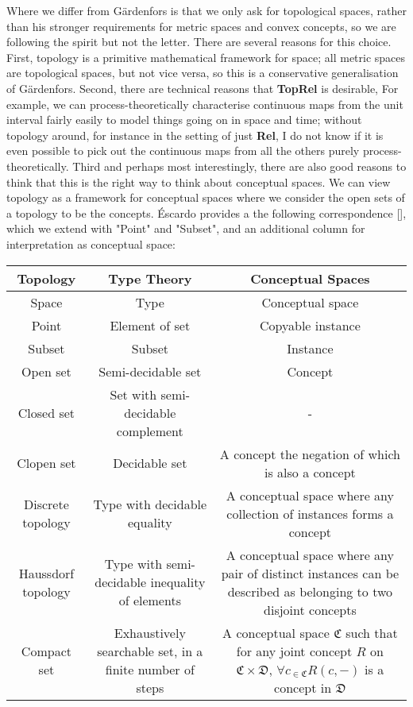 \begin{fullwidth}
Where we differ from G\"{a}rdenfors is that we only ask for topological spaces, rather than his stronger requirements for metric spaces and convex concepts, so we are following the spirit but not the letter. There are several reasons for this choice. First, topology is a primitive mathematical framework for space; all metric spaces are topological spaces, but not vice versa, so this is a conservative generalisation of G\"{a}rdenfors. Second, there are technical reasons that \textbf{TopRel} is desirable, For example, we can process-theoretically characterise continuous maps from the unit interval fairly easily to model things going on in space and time; without topology around, for instance in the setting of just \textbf{Rel}, I do not know if it is even possible to pick out the continuous maps from all the others purely process-theoretically. Third and perhaps most interestingly, there are also good reasons to think that this is the right way to think about conceptual spaces. We can view topology as a framework for conceptual spaces where we consider the open sets of a topology to be the concepts. \'{E}scardo provides a the following correspondence [], which we extend with "Point" and "Subset", and an additional column for interpretation as conceptual space:

\begin{table}[h]
\begin{tabular}{|c|c|c|}
\hline
\textbf{Topology} & \textbf{Type Theory} & \textbf{Conceptual Spaces}  \\ \hline
Space & Type & Conceptual space \\  \hline
Point & Element of set & Copyable instance \\  \hline
Subset & Subset & Instance \\  \hline
Open set & Semi-decidable set & Concept \\ \hline
Closed set & Set with semi-decidable complement & - \\ \hline
Clopen set & Decidable set & A concept the negation of which is also a concept \\ \hline
Discrete topology & Type with decidable equality & A conceptual space where any collection of instances forms a concept \\ \hline
Haussdorf topology & Type with semi-decidable inequality of elements & A conceptual space where any pair of distinct instances can be described as belonging to two disjoint concepts \\ \hline
Compact set & Exhaustively searchable set, in a finite number of steps & A conceptual space $\mathfrak{C}$ such that for any joint concept $R$ on $\mathfrak{C} \times \mathfrak{D}$, $\forall c_{ \in \mathfrak{C}}R(c, - )$ is a concept in $\mathfrak{D}$ \\ \hline
\end{tabular}
\end{table}


\end{fullwidth}

